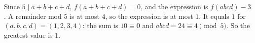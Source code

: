 Since $5\mid a+b+c+d$, $f(a+b+c+d)=0$, and the expression is $f(abcd)-3$. A remainder mod $5$ is at most $4$, so the expression is at most $1$. It equals $1$ for $(a,b,c,d)=(1,2,3,4)$: the sum is $10\equiv0$ and $abcd=24\equiv4\pmod5$. So the greatest value is $\boxed{1}$.
